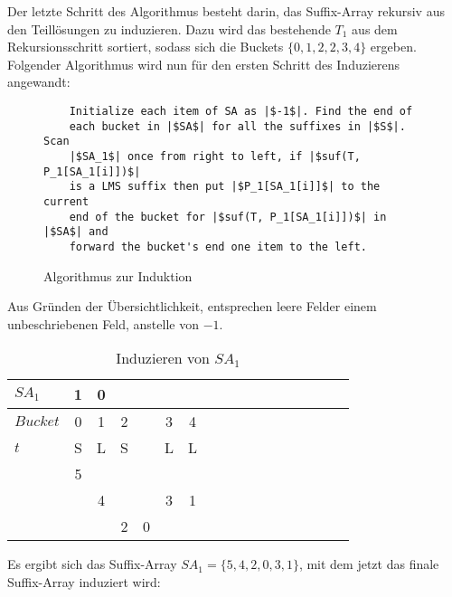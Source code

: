 \noindent Der letzte Schritt des Algorithmus besteht darin, das Suffix-Array \sa rekursiv aus den Teillösungen zu induzieren. Dazu wird das bestehende $T_1$ aus dem Rekursionsschritt sortiert, sodass sich die Buckets $\{0,1,2,2,3,4\}$ ergeben. Folgender Algorithmus wird nun für den ersten Schritt des Induzierens angewandt\cite[Kap.~4.5]{saca:6}:\newpage
\begin{figure}[H]
\begin{verbatim}
    Initialize each item of SA as |$-1$|. Find the end of
    each bucket in |$SA$| for all the suffixes in |$S$|. Scan
    |$SA_1$| once from right to left, if |$suf(T, P_1[SA_1[i]])$|
    is a LMS suffix then put |$P_1[SA_1[i]]$| to the current
    end of the bucket for |$suf(T, P_1[SA_1[i]])$| in |$SA$| and
    forward the bucket's end one item to the left.
\end{verbatim}
\caption{Algorithmus zur Induktion}
\end{figure}
\noindent Aus Gründen der Übersichtlichkeit, entsprechen leere Felder einem unbeschriebenen Feld, anstelle von $-1$.

\begin{table}[H]
\centering
  \begin{tabular}{ | l | c | c | c | c | c | c | c | c | c | c | c | c | c | c | c | c | }
    \hline
     $SA_1$ & 1 & 0 & & & & \\ \hline
   $Bucket$ & 0 & 1 & \multicolumn{1}{c}{2} & & 3 & 4 \\ \hline
      $t$   & S & L & \multicolumn{1}{c}{S} & & L & L \\ \hline
            & 5 & & & & &  \\ \hline
            & & 4 & & & 3 & 1 \\ \hline
            & & & 2 & 0 & & \\
    \hline
  \end{tabular}
  \caption{Induzieren von $SA_1$}
\end{table}
\bigskip

\noindent Es ergibt sich das Suffix-Array $SA_1 = \{5, 4, 2, 0, 3, 1\}$, mit dem jetzt das finale Suffix-Array \sa induziert wird:

